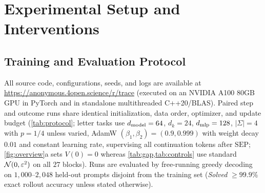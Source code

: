\section{Experimental Setup and Interventions}
\label{app:experiments}
\label{app:experimental-details}
\label{app:letter-protocol}
\label{app:reproducibility}
\setcounter{totalnumber}{8}
\setcounter{topnumber}{6}
\setcounter{bottomnumber}{6}
\renewcommand{\textfraction}{0.05}
\renewcommand{\topfraction}{0.95}
\renewcommand{\bottomfraction}{0.95}

\subsection{Training and Evaluation Protocol}

All source code, configurations, seeds, and logs are available at \url{https://anonymous.4open.science/r/trace} (executed on an NVIDIA A100 80GB GPU in PyTorch and in standalone multithreaded C++20/BLAS). Paired step and outcome runs share identical initialization, data order, optimizer, and update budget (\cref{tab:protocol}; letter tasks use $d_{\mathrm{model}} = 64$, $d_k = 24$, $d_{\mathrm{mlp}} = 128$, $|\Sigma| = 4$ with $p = 1/4$ unless varied, AdamW $(\beta_1, \beta_2) = (0.9, 0.999)$ with weight decay $0.01$ and constant learning rate, supervising all continuation tokens after $\mathrm{SEP}$; \cref{fig:overview}a sets $V(0) = 0$ whereas \cref{tab:gap,tab:controls} use standard $\mathcal N(0, \varepsilon^2)$ on all $27$ blocks). Runs are evaluated by free-running greedy decoding on $1{,}000$--$2{,}048$ held-out prompts disjoint from the training set (\emph{Solved} $\ge 99.9\%$ exact rollout accuracy unless stated otherwise).

\begin{table}[!htbp]
\caption{\textbf{Shared experimental settings across model tiers.}}
\label{tab:protocol}
\centering\footnotesize
{}
\end{table}

